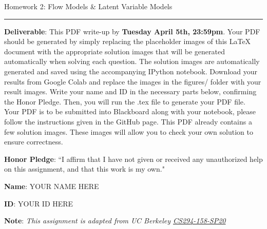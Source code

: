 \documentclass{article}
\newcommand{\ruleskip}{\bigskip\hrule\bigskip}
\begin{document}
\pagestyle{myheadings} 

{\huge
\noindent Homework 2: Flow Models \& Latent Variable Models}
\ruleskip

{\bf Deliverable}: This PDF write-up by {\bf Tuesday April 5th, 23:59pm}.  Your PDF should be generated by simply replacing the placeholder images of this LaTeX document with the appropriate solution images that will be generated automatically when solving each question. The solution images are automatically generated and saved using the accompanying IPython notebook.  Download your results from Google Colab and replace the images in the figures/ folder with your result images. Write your name and ID in the necessary parts below, confirming the Honor Pledge. Then, you will run the .tex file to generate your PDF file. Your PDF is to be submitted into Blackboard along with your notebook, please follow the instructions given in the GitHub page. This PDF already contains a few solution images.  These images will allow you to check your own solution to ensure correctness.

{\bf Honor Pledge}: ``I affirm that I have not given or received any unauthorized help on this assignment, and that this work is my own."

{\bf Name}: YOUR NAME HERE

{\bf ID}: YOUR ID HERE

\vspace{.1in}

{\bf Note}: \textit{This assignment is adapted from UC Berkeley \href{https://sites.google.com/view/berkeley-cs294-158-sp20/home}{CS294-158-SP20}}
\vspace{.2in}

\end{document}
